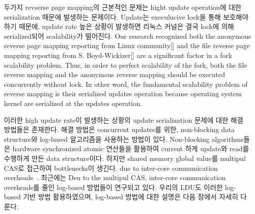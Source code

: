 \ifkor
두가지 revserse page mapping의 근본적인 문제는 hight update operation에 대한 serialization 때문에
발생하는 문제이다.
Update는 execulucive lock을 통해 보호해야하기 때문에, update rate 높은 상황이 발생하면 리눅스
커널은 결국 lock에 의해 serialized되어 scalability가 떨어진다.
\else
Our research recognized both the anonymous reverse page mapping
reporting from Linux community[] and the file reverse page mapping reporting from S.
Boyd-Wickizer[] are a significant factor in a fork scalability problem.
Thus, in order to perfect scalability of the fork, both the
file reverse mapping and the anonymous reverse mapping should be executed
concurrently without lock.
In other word, the fundamental scalability problem of reverse mapping is their
serialized updates operation because operating system kernel are serialized at
the updates operation.



\fi


\ifkor
이러한 high update rate이 발생하는 상황의 update serialization 문제에 대한 해결 방법들은 존재한다. 
해결 방법은 concurrent updates를 위한, non-blocking data structure와
log-based 알고리즘을 사용하는 방법이 있다.
Non-blocking algorithms들은 hardware synchronized atomic 연산들을 활용하여 current 하게
update와 read를 수행하게 만든 data structure이다.
하지만 shared memory global value를 multipul CAS로 접근하여 bottlenecks이 생긴다.
due to inter-core communication overheads~\cite{SilasBoydWickizerPth}.
최근에는 Deu to the multipul CAS, inter-core communication overheads를 줄인 log-based
방법들이 연구되고 있다.
우리의 LDU도 이러한 log-based 기반 방법 활용하였으며, log-based 방법에 대한 설명은 다음 장에서 자세히 다룬다.
\else

